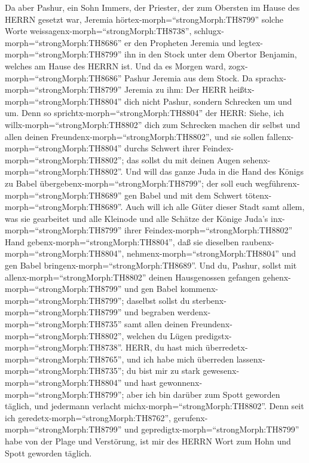  Da aber Pashur, ein Sohn Immers, der Priester, der zum
Obersten im Hause des HERRN gesetzt war, Jeremia
hörtex-morph=``strongMorph:TH8799'' solche Worte
weissagenx-morph=``strongMorph:TH8738'', 
schlugx-morph=``strongMorph:TH8686'' er den Propheten Jeremia und
legtex-morph=``strongMorph:TH8799'' ihn in den Stock unter dem Obertor
Benjamin, welches am Hause des HERRN ist.  Und da es Morgen
ward, zogx-morph=``strongMorph:TH8686'' Pashur Jeremia aus dem Stock. Da
sprachx-morph=``strongMorph:TH8799'' Jeremia zu ihm: Der HERR
heißtx-morph=``strongMorph:TH8804'' dich nicht Pashur, sondern Schrecken
um und um.  Denn so sprichtx-morph=``strongMorph:TH8804''
der HERR: Siehe, ich willx-morph=``strongMorph:TH8802'' dich zum
Schrecken machen dir selbst und allen deinen
Freundenx-morph=``strongMorph:TH8802'', und sie sollen
fallenx-morph=``strongMorph:TH8804'' durchs Schwert ihrer
Feindex-morph=``strongMorph:TH8802''; das sollst du mit deinen Augen
sehenx-morph=``strongMorph:TH8802''. Und will das ganze Juda in die Hand
des Königs zu Babel übergebenx-morph=``strongMorph:TH8799''; der soll
euch wegführenx-morph=``strongMorph:TH8689'' gen Babel und mit dem
Schwert tötenx-morph=``strongMorph:TH8689''.  Auch will ich
alle Güter dieser Stadt samt allem, was sie gearbeitet und alle Kleinode
und alle Schätze der Könige Juda's inx-morph=``strongMorph:TH8799''
ihrer Feindex-morph=``strongMorph:TH8802'' Hand
gebenx-morph=``strongMorph:TH8804'', daß sie dieselben
raubenx-morph=``strongMorph:TH8804'',
nehmenx-morph=``strongMorph:TH8804'' und gen Babel
bringenx-morph=``strongMorph:TH8689''.  Und du, Pashur,
sollst mit allenx-morph=``strongMorph:TH8802'' deinen Hausgenossen
gefangen gehenx-morph=``strongMorph:TH8799'' und gen Babel
kommenx-morph=``strongMorph:TH8799''; daselbst sollst du
sterbenx-morph=``strongMorph:TH8799'' und begraben
werdenx-morph=``strongMorph:TH8735'' samt allen deinen
Freundenx-morph=``strongMorph:TH8802'', welchen du Lügen
predigstx-morph=``strongMorph:TH8738''.  HERR, du hast mich
überredetx-morph=``strongMorph:TH8765'', und ich habe mich überreden
lassenx-morph=``strongMorph:TH8735''; du bist mir zu stark
gewesenx-morph=``strongMorph:TH8804'' und hast
gewonnenx-morph=``strongMorph:TH8799''; aber ich bin darüber zum Spott
geworden täglich, und jedermann verlacht
michx-morph=``strongMorph:TH8802''.  Denn seit ich
geredetx-morph=``strongMorph:TH8762'',
gerufenx-morph=``strongMorph:TH8799'' und
gepredigtx-morph=``strongMorph:TH8799'' habe von der Plage und
Verstörung, ist mir des HERRN Wort zum Hohn und Spott geworden täglich.
